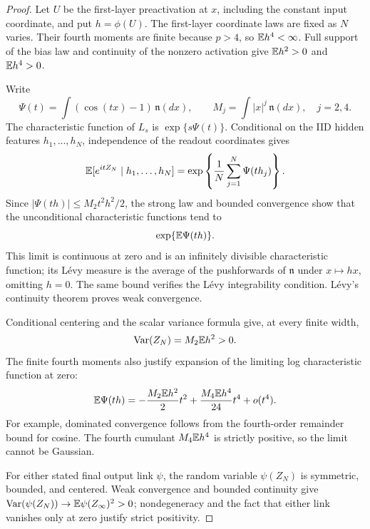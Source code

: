 \begin{proof}
Let $U$ be the first-layer preactivation at $x$, including the constant input coordinate, and put $h=\phi(U)$. The first-layer coordinate laws are fixed as $N$ varies. Their fourth moments are finite because $p>4$, so $\mathbb E h^4<\infty$. Full support of the bias law and continuity of the nonzero activation give $\mathbb E h^2>0$ and $\mathbb E h^4>0$.

Write
\[
 \Psi(t)=\int(\cos(tx)-1)\,\mathfrak n(dx),
 \qquad M_j=\int |x|^j\,\mathfrak n(dx),\quad j=2,4.
\]
The characteristic function of $L_s$ is $\exp\{s\Psi(t)\}$. Conditional on the IID hidden features $h_1,\ldots,h_N$, independence of the readout coordinates gives
\[
 \mathbb E[e^{itZ_N}\mid h_1,\ldots,h_N]
   =\exp\left\{\frac1N\sum_{j=1}^N\Psi(th_j)\right\}.
\]
Since $|\Psi(th)|\le M_2t^2h^2/2$, the strong law and bounded convergence show that the unconditional characteristic functions tend to
\[
 \exp\{\mathbb E\Psi(th)\}.
\]
This limit is continuous at zero and is an infinitely divisible characteristic function; its L\'evy measure is the average of the pushforwards of $\mathfrak n$ under $x\mapsto hx$, omitting $h=0$. The same bound verifies the L\'evy integrability condition. L\'evy's continuity theorem proves weak convergence.

Conditional centering and the scalar variance formula give, at every finite width,
\[
 \operatorname{Var}(Z_N)=M_2\mathbb E h^2>0.
\]
The finite fourth moments also justify expansion of the limiting log characteristic function at zero:
\[
 \mathbb E\Psi(th)
   =-\frac{M_2\mathbb E h^2}{2}t^2
     +\frac{M_4\mathbb E h^4}{24}t^4+o(t^4).
\]
For example, dominated convergence follows from the fourth-order remainder bound for cosine. The fourth cumulant $M_4\mathbb E h^4$ is strictly positive, so the limit cannot be Gaussian.

For either stated final output link $\psi$, the random variable $\psi(Z_N)$ is symmetric, bounded, and centered. Weak convergence and bounded continuity give
$\operatorname{Var}(\psi(Z_N))\to\mathbb E\psi(Z_\infty)^2>0$; nondegeneracy and the fact that either link vanishes only at zero justify strict positivity.
\end{proof}
